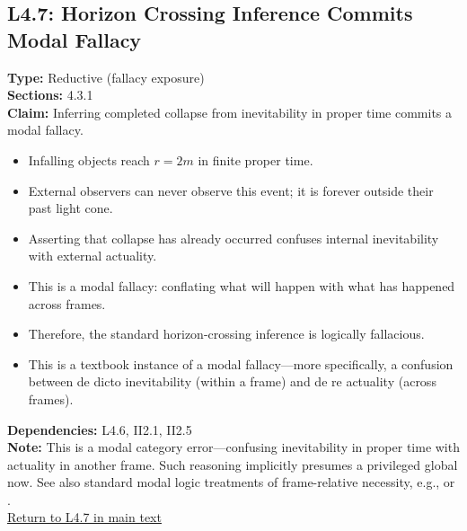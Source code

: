 \documentclass[12pt]{book}
\newcommand{\returnlink}[1]{\hyperref[logic:#1]{Return to #1 in main text}\xspace}
\begin{document}
\subsection*{L4.7: Horizon Crossing Inference Commits Modal Fallacy}\label{appendix:L4.7}
\textbf{Type:} Reductive (fallacy exposure) \\
\textbf{Sections:} 4.3.1 \\
\textbf{Claim:} Inferring completed collapse from inevitability in proper time commits a modal fallacy.
\begin{itemize}
  \item Infalling objects reach \( r = 2m \) in finite proper time.
  \item External observers can never observe this event; it is forever outside their past light cone.
  \item Asserting that collapse has already occurred confuses internal inevitability with external actuality.
  \item This is a modal fallacy: conflating what will happen with what has happened across frames. 
  \item Therefore, the standard horizon-crossing inference is logically fallacious.
  \item This is a textbook instance of a modal fallacy---more specifically, a confusion between de dicto inevitability (within a frame) and de re actuality (across frames).
\end{itemize}
\textbf{Dependencies:} L4.6, II2.1, II2.5 \\
\textbf{Note:} This is a modal category error---confusing inevitability in proper time with actuality in another frame. Such reasoning implicitly presumes a privileged global now. See also standard modal logic treatments of frame-relative necessity, e.g., \cite{kripke1980} or \cite{lewis1986}.\\
\returnlink{L4.7}
\end{document}
